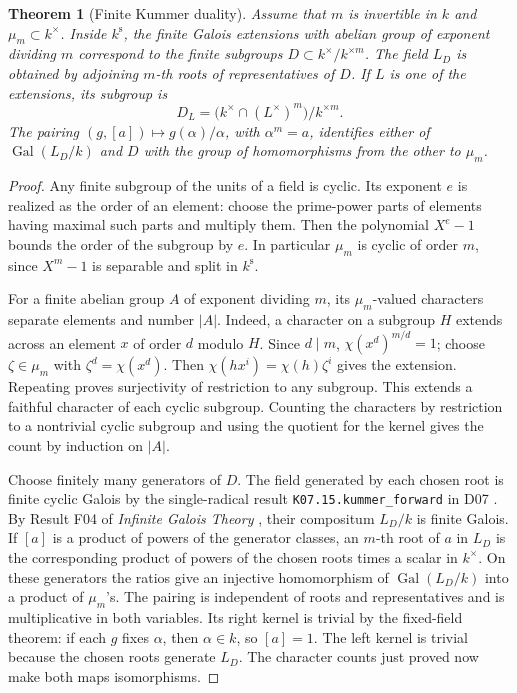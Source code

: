 \documentclass[11pt,oneside,openany]{book}
\newtheorem{theorem}{Theorem}[chapter]
\theoremstyle{definition}
\theoremstyle{remark}
\begin{document}
\begin{theorem}[Finite Kummer duality]
\label{res:GH07}
Assume that \(m\) is invertible in \(k\) and
\(\mu_m\subset k^\times\). Inside \(k^{\mathrm s}\), the finite Galois
extensions with abelian group of exponent dividing \(m\)
correspond to the finite subgroups \(D\subset k^\times/k^{\times m}\).
The field \(L_D\) is obtained by adjoining \(m\)-th roots of
representatives of \(D\). If \(L\) is one of the extensions, its
subgroup is
\[
 D_L=\bigl(k^\times\cap (L^\times)^m\bigr)/k^{\times m}.
\]
The pairing \((g,[a])\mapsto g(\alpha)/\alpha\), with \(\alpha^m=a\),
identifies either of \(\operatorname{Gal}(L_D/k)\) and \(D\) with the
group of homomorphisms from the other to \(\mu_m\).
\end{theorem}
\begin{proof}
Any finite subgroup of the units of a field is cyclic. Its exponent
\(e\) is realized as the order of an element: choose the prime-power
parts of elements having maximal such parts and multiply them.
Then the polynomial \(X^e-1\) bounds the order of the subgroup by \(e\).
In particular \(\mu_m\) is cyclic of order \(m\), since \(X^m-1\) is
separable and split in \(k^{\mathrm s}\).

For a finite abelian group \(A\) of exponent dividing \(m\), its
\(\mu_m\)-valued characters separate elements and number \(|A|\).
Indeed, a character on a subgroup \(H\) extends across an element
\(x\) of order \(d\) modulo \(H\). Since \(d\mid m\),
\(\chi(x^d)^{m/d}=1\); choose \(\zeta\in\mu_m\) with
\(\zeta^d=\chi(x^d)\). Then
\(\chi(hx^i)=\chi(h)\zeta^i\) gives the extension. Repeating proves
surjectivity of restriction to any subgroup. This extends a faithful
character of each cyclic subgroup. Counting the characters by
restriction to a nontrivial cyclic subgroup and using the quotient
for the kernel gives the count by induction on \(|A|\).

Choose finitely many generators of \(D\). The field generated by
each chosen root is finite cyclic Galois by the single-radical
result \texttt{K07.15.kummer\_forward} in D07
\cite[PDF p.~135]{mg-d07}. By Result F04 of
\emph{Infinite Galois Theory} \cite[PDF p.~5]{mg-aft},
their compositum \(L_D/k\) is finite Galois.
If \([a]\) is a product of powers of the generator classes, an
\(m\)-th root of \(a\) in \(L_D\) is the corresponding product of
powers of the chosen roots times a scalar in \(k^\times\).
On these generators the ratios give an injective homomorphism
of \(\operatorname{Gal}(L_D/k)\) into a product of \(\mu_m\)'s.
The pairing is independent of roots and representatives and is
multiplicative in both variables. Its right kernel is trivial by
the fixed-field theorem: if each \(g\) fixes \(\alpha\), then
\(\alpha\in k\), so \([a]=1\). The left kernel is trivial because
the chosen roots generate \(L_D\). The character counts just proved
now make both maps isomorphisms.


\end{proof}
\end{document}
